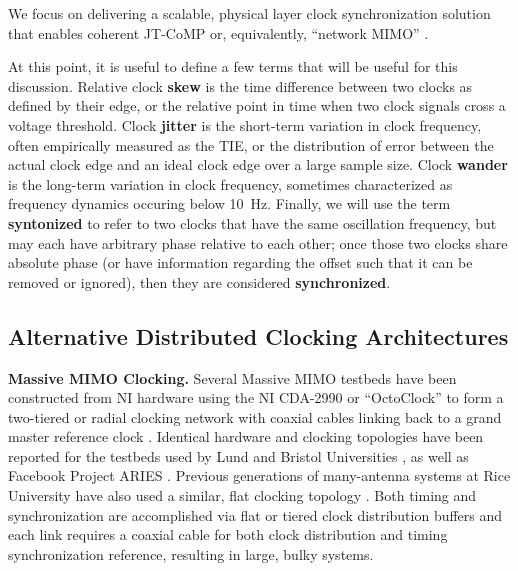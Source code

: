 	We focus on delivering a scalable, physical layer clock synchronization solution that enables coherent \ac{JT}-\ac{CoMP} or, equivalently, ``network \ac{MIMO}'' \cite{huh2012network}.
	
		At this point, it is useful to define a few terms that will be useful for this discussion.
	Relative clock \textbf{skew} is the time difference between two clocks as defined by their edge, or the relative point in time when two clock signals cross a voltage threshold.
	Clock \textbf{jitter} is the short-term variation in clock frequency, often empirically measured as the \ac{TIE}, or the distribution of error between the actual clock edge and an ideal clock edge over a large sample size.
	Clock \textbf{wander} is the long-term variation in clock frequency, sometimes characterized as frequency dynamics occuring below 10~Hz.
	Finally, we will use the term \textbf{syntonized} to refer to two clocks that have the same oscillation frequency, but may each have arbitrary phase relative to each other; once those two clocks share absolute phase (or have information regarding the offset such that it can be removed or ignored), then they are considered \textbf{synchronized}.
	
\subsection{Alternative Distributed Clocking Architectures}
\label{sec_comp_alts}

\textbf{Massive MIMO Clocking.}
	Several Massive \ac{MIMO} testbeds have been constructed from \ac{NI} hardware using the \ac{NI} CDA-2990 or ``OctoClock'' to form a two-tiered or radial clocking network with coaxial cables linking back to a grand master reference clock \cite{luther20145g}.
	Identical hardware and clocking topologies have been reported for the testbeds used by Lund and Bristol Universities \cite{vieira2014flexible}, as well as Facebook Project ARIES \cite{choubey2016introducing}.
	Previous generations of many-antenna systems at Rice University have also used a similar, flat clocking topology \cite{shepard2012argos, shepard2013argosv2}.
	Both timing and synchronization are accomplished via flat or tiered clock distribution buffers and each link requires a coaxial cable for both clock distribution and timing synchronization reference, resulting in large, bulky systems.
	
